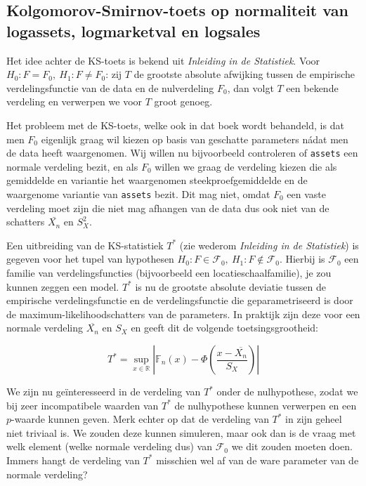 \documentclass[a4paper]{report}
\begin{document}
\subsection{Kolgomorov-Smirnov-toets op normaliteit van logassets, logmarketval en logsales}  
\label{KS-toets}
  Het idee achter de KS-toets is bekend uit \emph{Inleiding in de Statistiek}. Voor $H_0: F = F_0, \ H_1: F \neq F_0$: zij $T$ de grootste absolute afwijking tussen de empirische verdelingsfunctie van de data en de nulverdeling $F_0$, dan volgt $T$ een bekende verdeling en verwerpen we voor $T$ groot genoeg.
  
  Het probleem met de KS-toets, welke ook in dat boek wordt behandeld, is dat men $F_0$ eigenlijk graag wil kiezen op basis van geschatte parameters n\' adat men de data heeft waargenomen. Wij willen nu bijvoorbeeld controleren of \verb!assets! een normale verdeling bezit, en als $F_0$ willen we graag de verdeling kiezen die als gemiddelde en variantie het waargenomen steekproefgemiddelde en de waargenome variantie van \verb!assets! bezit. Dit mag niet, omdat $F_0$ een vaste verdeling moet zijn die niet mag afhangen van de data dus ook niet van de schatters $\bar{X_n}$ en $S^2_X$.
  
  Een uitbreiding van de KS-statistiek $T^*$ (zie wederom \emph{Inleiding in de Statistiek}) is gegeven voor het tupel van hypothesen $H_0: F \in \mathcal{F}_0, \ H_1: F \not \in \mathcal{F}_0$. Hierbij is $\mathcal{F}_0$ een familie van verdelingsfuncties (bijvoorbeeld een locatieschaalfamilie), je zou kunnen zeggen een model. $T^*$ is nu de grootste absolute deviatie tussen de empirische verdelingsfunctie en de verdelingsfunctie die geparametriseerd is door de maximum-likelihoodschatters van de parameters. In praktijk zijn deze voor een normale verdeling $\overline{X_n}$ en $S_X$ en geeft dit de volgende toetsingsgrootheid:

  \begin{equation}
    T^* = \sup_{x\in \mathbb{R}} | \mathbb{F}_n(x) - \Phi(\frac{x-\overline{X_n}}{S_X})|
  \end{equation}  	
	
   We zijn nu ge\"interesseerd in de verdeling van $T^*$ onder de nulhypothese, zodat we bij zeer incompatibele waarden van $T^*$ de nulhypothese kunnen verwerpen en een $p$-waarde kunnen geven. Merk echter op dat de verdeling van $T^*$ in zijn geheel niet triviaal is. We zouden deze kunnen simuleren, maar ook dan is de vraag met welk element (welke normale verdeling dus) van $\mathcal{F}_0$ we dit zouden moeten doen. Immers hangt de verdeling van $T^*$ misschien wel af van de ware parameter van de normale verdeling? 
   
\end{document}

